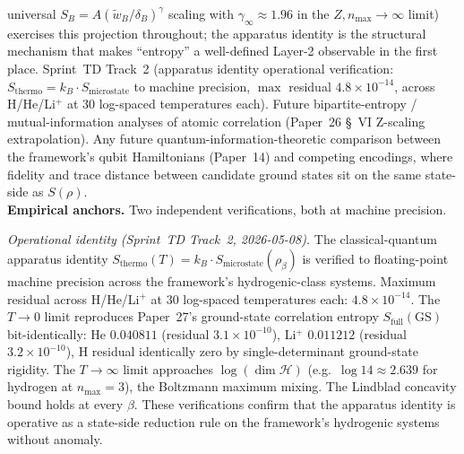 \documentclass[11pt]{article}
\begin{document}
universal $S_B = A(\tilde{w}_B/\delta_B)^\gamma$ scaling with
$\gamma_\infty \approx 1.96$ in the $Z, n_{\max} \to \infty$ limit)
exercises this projection throughout; the apparatus identity is the
structural mechanism that makes ``entropy'' a well-defined Layer-2
observable in the first place.  Sprint~TD Track~2 (apparatus identity
operational verification: $S_\mathrm{thermo} = k_B \cdot
S_\mathrm{microstate}$ to machine precision, $\max$ residual
$4.8\times 10^{-14}$, across H/He/Li$^+$ at $30$ log-spaced
temperatures each).  Future bipartite-entropy / mutual-information
analyses of atomic correlation (Paper~26 \S~VI Z-scaling
extrapolation).  Any future quantum-information-theoretic comparison
between the framework's qubit Hamiltonians (Paper~14) and competing
encodings, where fidelity and trace distance between candidate ground
states sit on the same state-side as $S(\rho)$.\\
\textbf{Empirical anchors.}  Two independent verifications, both at
machine precision.
\smallskip

\textit{Operational identity (Sprint~TD Track~2, 2026-05-08).}  The
classical-quantum apparatus identity $S_\mathrm{thermo}(T) = k_B \cdot
S_\mathrm{microstate}(\rho_\beta)$ is verified to floating-point
machine precision across the framework's hydrogenic-class systems.
Maximum residual across H/He/Li$^+$ at $30$ log-spaced temperatures
each: $4.8 \times 10^{-14}$.  The $T \to 0$ limit reproduces
Paper~27's ground-state correlation entropy $S_\mathrm{full}(\mathrm{GS})$
bit-identically: He $0.040811$ (residual $3.1\times 10^{-10}$),
Li$^+$ $0.011212$ (residual $3.2\times 10^{-10}$), H residual
identically zero by single-determinant ground-state rigidity.  The
$T \to \infty$ limit approaches $\log(\dim \mathcal{H})$ (e.g.\ $\log
14 \approx 2.639$ for hydrogen at $n_{\max}=3$), the Boltzmann maximum
mixing.  The Lindblad concavity bound holds at every $\beta$.  These
verifications confirm that the apparatus identity is operative as a
state-side reduction rule on the framework's hydrogenic systems
without anomaly.
\smallskip
\end{document}
